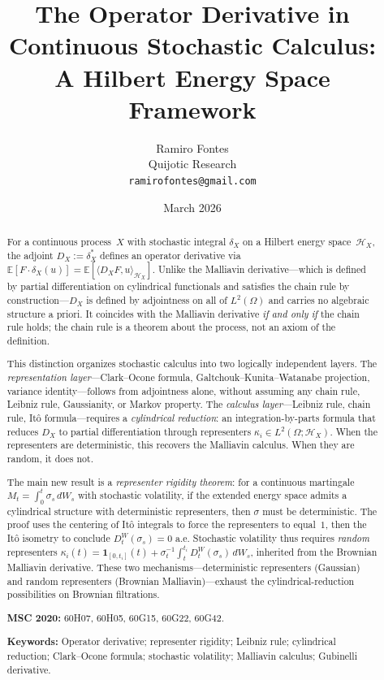 \documentclass[11pt,a4paper]{article}
\title{The Operator Derivative in Continuous Stochastic Calculus:\\ A Hilbert Energy Space Framework}
\author{Ramiro Fontes\\ Quijotic Research\\ \texttt{ramirofontes@gmail.com}}
\date{March 2026}
\theoremstyle{plain}
\theoremstyle{definition}
\theoremstyle{remark}
\newcommand{\E}{\mathbb{E}}
\newcommand{\HX}{\mathcal{H}_X}
\begin{document}
\maketitle

\begin{abstract}
For a continuous process~$X$ with stochastic integral $\delta_X$ on a Hilbert energy space~$\HX$, the adjoint $D_X := \delta_X^*$ defines an operator derivative via $\E[F \cdot \delta_X(u)] = \E[\langle D_X F, u \rangle_{\HX}]$. Unlike the Malliavin derivative---which is defined by partial differentiation on cylindrical functionals and satisfies the chain rule by construction---$D_X$ is defined by adjointness on all of $L^2(\Omega)$ and carries no algebraic structure a priori. It coincides with the Malliavin derivative \emph{if and only if} the chain rule holds; the chain rule is a theorem about the process, not an axiom of the definition.

This distinction organizes stochastic calculus into two logically independent layers. The \emph{representation layer}---Clark--Ocone formula, Galtchouk--Kunita--Watanabe projection, variance identity---follows from adjointness alone, without assuming any chain rule, Leibniz rule, Gaussianity, or Markov property. The \emph{calculus layer}---Leibniz rule, chain rule, It\^o formula---requires a \emph{cylindrical reduction}: an integration-by-parts formula that reduces $D_X$ to partial differentiation through representers $\kappa_i \in L^2(\Omega;\HX)$. When the representers are deterministic, this recovers the Malliavin calculus. When they are random, it does not.

The main new result is a \emph{representer rigidity theorem}: for a continuous martingale $M_t = \int_0^t \sigma_s\,dW_s$ with stochastic volatility, if the extended energy space admits a cylindrical structure with deterministic representers, then $\sigma$ must be deterministic. The proof uses the centering of It\^o integrals to force the representers to equal~$1$, then the It\^o isometry to conclude $D_t^W(\sigma_s) = 0$ a.e. Stochastic volatility thus requires \emph{random} representers $\kappa_i(t) = \mathbf{1}_{[0,t_i]}(t) + \sigma_t^{-1}\int_t^{t_i} D_t^W(\sigma_s)\,dW_s$, inherited from the Brownian Malliavin derivative. These two mechanisms---deterministic representers (Gaussian) and random representers (Brownian Malliavin)---exhaust the cylindrical-reduction possibilities on Brownian filtrations.

\smallskip\noindent\textbf{MSC 2020:} 60H07, 60H05, 60G15, 60G22, 60G42.

\smallskip\noindent\textbf{Keywords:} Operator derivative; representer rigidity; Leibniz rule; cylindrical reduction; Clark--Ocone formula; stochastic volatility; Malliavin calculus; Gubinelli derivative.
\end{abstract}
\end{document}
